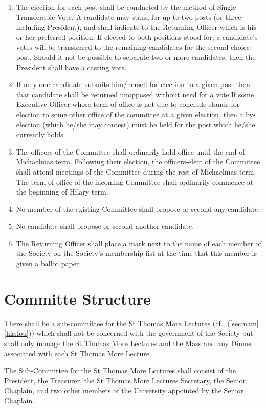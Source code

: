 \documentclass[11pt]{article}
\begin{document}
\begin{enumerate}
\item The election for each post shall be conducted by the method of Single Transferable Vote. A candidate may stand for up to two posts (or three including President), and shall indicate to the Returning Officer which is his or her preferred position. If elected to both positions stood for, a candidate's votes will be transferred to the remaining candidates for the second-choice post. Should it not be possible to separate two or more candidates, then the President shall have a casting vote.
\item If only one candidate submits him/herself for election to a given post then that candidate shall be returned unopposed without need for a vote.If some Executive Officer whose term of office is not due to conclude stands for election to some other office of the committee at a given election, then a by-election (which he/she may contest) must be held for the post which he/she currently holds.
\item The officers of the Committee shall ordinarily hold office until the end of Michaelmas term. Following their election, the officers-elect of the Committee shall attend meetings of the Committee during the rest of Michaelmas term. The term of office of the incoming Committee shall ordinarily commence at the beginning of Hilary term.
\item No member of the existing Committee shall propose or second any candidate.
\item No candidate shall propose or second another candidate.
\item The Returning Officer shall place a mark next to the name of each member of the Society on the Society's membership list at the time that this member is given a ballot paper.
\end{enumerate}
\section{Committe Structure}\label{byl:str}
There shall be a sub-committee for the St Thomas More Lectures (cf.,  (\cref{sec:nam} \cref{his:fou})) which shall not be concerned with the government of the Society but shall only manage the St Thomas More Lectures and the Mass and any Dinner associated with each St Thomas More Lecture.

The Sub-Committee for the St Thomas More Lectures shall consist of the President, the Treasurer, the St Thomas More Lectures Secretary, the Senior Chaplain, and two other members of the University appointed by the Senior Chaplain.
\end{document}
